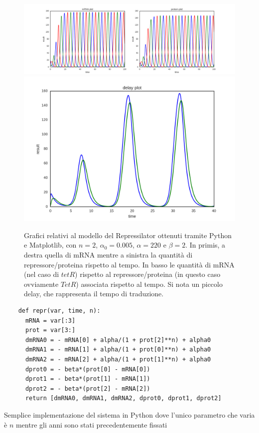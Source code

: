 \documentclass[a4paper,12pt, oneside]{book}
\begin{document}
\begin{figure}[H]
  \centering
  \includegraphics[scale = 0.35]{img/mrna-prot.png}
  \includegraphics[scale = 0.35]{img/delay.png}
  \caption{Grafici relativi al modello del Repressilator ottenuti tramite
    Python e Matplotlib, con $n=2$, $\alpha_0=0.005$, $\alpha=220$ e $\beta=2$. In
    primis, a destra quella di mRNA mentre a 
    sinistra la quantità di repressore/proteina rispetto al tempo. In basso le
    quantità di mRNA (nel caso di $tetR$) rispetto al repressore/proteina (in
    questo caso ovviamente $TetR$) associata rispetto al tempo. Si nota un
    piccolo delay, che rappresenta il tempo di traduzione.}     
\end{figure}
\begin{listing}
  \begin{verbatim}
    def repr(var, time, n):
      mRNA = var[:3]
      prot = var[3:]
      dmRNA0 = - mRNA[0] + alpha/(1 + prot[2]**n) + alpha0
      dmRNA1 = - mRNA[1] + alpha/(1 + prot[0]**n) + alpha0
      dmRNA2 = - mRNA[2] + alpha/(1 + prot[1]**n) + alpha0
      dprot0 = - beta*(prot[0] - mRNA[0])
      dprot1 = - beta*(prot[1] - mRNA[1])
      dprot2 = - beta*(prot[2] - mRNA[2])
      return [dmRNA0, dmRNA1, dmRNA2, dprot0, dprot1, dprot2]
  \end{verbatim}
  \caption{Semplice implementazione del sistema in Python dove l'unico parametro
  che varia è $n$ mentre gli anni sono stati precedentemente fissati}
\end{listing}
\end{document}
